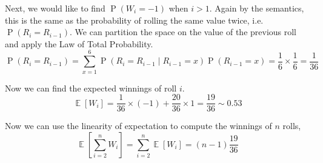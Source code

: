 \documentclass[letterpaper,11pt]{article}
\DeclareMathOperator{\Prob}{P}
\renewcommand{\P}[1]{\Prob{\parens{#1}}}
\DeclareMathOperator{\Expect}{\mathbb{E}}
\newcommand{\E}[1]{\Expect{\left[#1\right]}}
\newcommand{\parens}[1]{\left(#1\right)}
\newcommand{\given}{\;\vert\;}
\begin{document}
Next, we would like to find $\P{W_i = -1}$ when $i > 1$.
Again by the semantics, this is the same as the probability of rolling the same
value twice, i.e. $\P{R_i = R_{i-1}}$. We can partition the space on the value
of the previous roll and apply the Law of Total Probability.
\begin{equation*}
    \P{R_i = R_{i-1}}
    = \sum_{x = 1}^6 {
        \P{R_i = R_{i-1} \given R_{i-1} = x} \P{R_{i-1} = x}
    }
    = \frac{1}{6} \times \frac{1}{6}
    = \frac{1}{36}
\end{equation*}

Now we can find the expected winnings of roll $i$.
\begin{equation*}
    \E{W_i}
    = \frac{1}{36} \times (-1)
    + \frac{20}{36} \times 1
    = \frac{19}{36}
    \sim 0.53
\end{equation*}

Now we can use the linearity of expectation to compute the winnings of $n$
rolls,
\begin{equation*}
    \E{\sum_{i=2}^n W_i} = \sum_{i=2}^n \E{W_i} = (n-1)\frac{19}{36}
\end{equation*}
\end{document}
